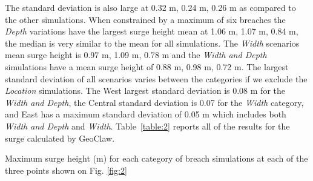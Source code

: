 \documentclass{coastal_paper}
\begin{document}
The standard deviation is also large at 0.32 m, 0.24 m, 0.26 m as compared to the other simulations. When constrained by a maximum of six breaches the \emph{Depth} variations have the largest surge height mean at 1.06 m, 1.07 m, 0.84 m, the median is very similar to the mean for all simulations. The \emph{Width} scenarios mean surge height is 0.97 m, 1.09 m, 0.78 m and the \emph{Width and Depth} simulations have a mean surge height of 0.88 m, 0.98 m, 0.72 m.
 The largest standard deviation of all scenarios varies between the categories if we exclude the \emph{Location} simulations. The West largest standard deviation is 0.08 m for the \emph{Width and Depth}, the Central standard deviation is 0.07 for the \emph{Width} category, and East has a maximum standard deviation of 0.05 m which includes both \emph{Width and Depth} and \emph{Width}. Table~\ref{table:2} reports all of the results for the surge calculated by GeoClaw.
 
\begin{table}[ht]
    \begin{adjustbox}{width=0.9\textwidth} %
    
    \end{adjustbox}
    \caption{Maximum surge height (m) for each category of breach simulations at each of the three points shown on Fig. \ref{fig:2}}
    \label{table:2}
\end{table}
\end{document}

